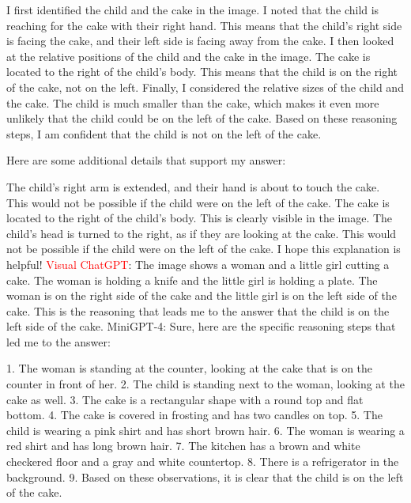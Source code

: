 \begin{enumerate}
        I first identified the child and the cake in the image.
        I noted that the child is reaching for the cake with their right hand. This means that the child's right side is facing the cake, and their left side is facing away from the cake.
        I then looked at the relative positions of the child and the cake in the image. The cake is located to the right of the child's body. This means that the child is on the right of the cake, not on the left.
        Finally, I considered the relative sizes of the child and the cake. The child is much smaller than the cake, which makes it even more unlikely that the child could be on the left of the cake.
        Based on these reasoning steps, I am confident that the child is not on the left of the cake.

        Here are some additional details that support my answer:

        The child's right arm is extended, and their hand is about to touch the cake. This would not be possible if the child were on the left of the cake.
        The cake is located to the right of the child's body. This is clearly visible in the image.
        The child's head is turned to the right, as if they are looking at the cake. This would not be possible if the child were on the left of the cake.
        I hope this explanation is helpful!
        \subitem \textcolor{red}{Visual ChatGPT}: The image shows a woman and a little girl cutting a cake. The woman is holding a knife and the little girl is holding a plate. The woman is on the right side of the cake and the little girl is on the left side of the cake. This is the reasoning that leads me to the answer that the child is on the left side of the cake.
        \subitem MiniGPT-4: Sure, here are the specific reasoning steps that led me to the answer:

        1. The woman is standing at the counter, looking at the cake that is on the counter in front of her.
        2. The child is standing next to the woman, looking at the cake as well.
        3. The cake is a rectangular shape with a round top and flat bottom.
        4. The cake is covered in frosting and has two candles on top.
        5. The child is wearing a pink shirt and has short brown hair.
        6. The woman is wearing a red shirt and has long brown hair.
        7. The kitchen has a brown and white checkered floor and a gray and white countertop.
        8. There is a refrigerator in the background.
        9. Based on these observations, it is clear that the child is on the left of the cake.
    \end{enumerate}
